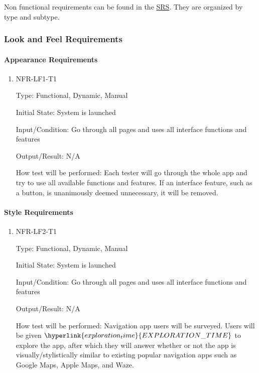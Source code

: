 \documentclass[12pt, titlepage]{article}
\begin{document}


Non functional requirements can be found in the
\href{https://github.com/parkd-app/park-d/blob/main/docs/SRS/SRS.pdf}{SRS}. They
are organized by type and subtype.

\subsubsection{Look and Feel Requirements}
\label{sec:5.2.1}
\paragraph{Appearance Requirements}

\begin{enumerate}

\item{NFR-LF1-T1}

Type: Functional, Dynamic, Manual
					
Initial State: System is launched
					
Input/Condition: Go through all pages and uses all interface functions and
features
					
Output/Result: N/A
					
How test will be performed: Each tester will go through the whole app and try to
use all available functions and features. If an interface feature, such as a
button, is unanimously deemed unnecessary, it will be removed.
					
\end{enumerate}

\paragraph{Style Requirements}

\begin{enumerate}

\item{NFR-LF2-T1}

Type: Functional, Dynamic, Manual
					
Initial State: System is launched
					
Input/Condition: Go through all pages and uses all interface functions and
features
					
Output/Result: N/A
					
How test will be performed: Navigation app users will be surveyed. Users will be
given $\hyperlink{exploration_time}{EXPLORATION\_TIME}$ to explore the app,
after which they will answer whether or not the app is visually/stylistically
similar to existing popular navigation apps such as Google Maps, Apple Maps, and
Waze.
					
\end{enumerate}
\end{document}
